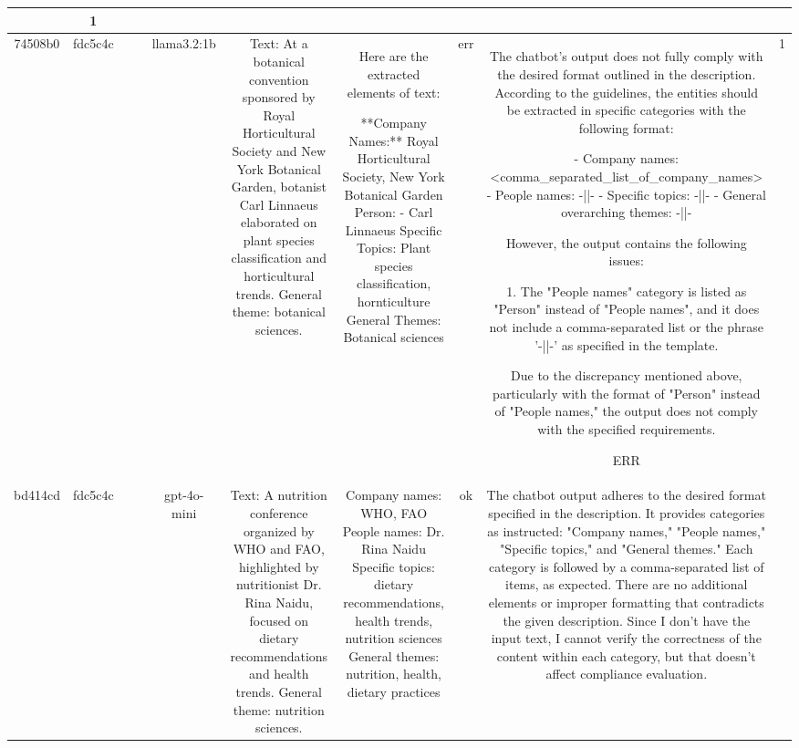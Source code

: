 \begin{table}[h!]
\begin{tabular}{|c|c|c|c|c|c|c|c|c|c|}
{ERR & 1\\
\hline
74508b0 & fdc5c4c &  &  & llama3.2:1b & Text: At a botanical convention sponsored by Royal Horticultural Society and New York Botanical Garden, botanist Carl Linnaeus elaborated on plant species classification and horticultural trends. General theme: botanical sciences. & Here are the extracted elements of text:

**Company Names:** Royal Horticultural Society, New York Botanical Garden
Person:
  - Carl Linnaeus
Specific Topics: Plant species classification, hornticulture
General Themes: Botanical sciences & err & The chatbot's output does not fully comply with the desired format outlined in the description. According to the guidelines, the entities should be extracted in specific categories with the following format: 

- Company names: <comma_separated_list_of_company_names>
- People names: -||-
- Specific topics: -||-
- General overarching themes: -||-

However, the output contains the following issues:

1. The "People names" category is listed as "Person" instead of "People names", and it does not include a comma-separated list or the phrase '-||-' as specified in the template.

Due to the discrepancy mentioned above, particularly with the format of "Person" instead of "People names," the output does not comply with the specified requirements. 

ERR & 1\\
\hline
bd414cd & fdc5c4c &  &  & gpt-4o-mini & Text: A nutrition conference organized by WHO and FAO, highlighted by nutritionist Dr. Rina Naidu, focused on dietary recommendations and health trends. General theme: nutrition sciences. & Company names: WHO, FAO  
People names: Dr. Rina Naidu  
Specific topics: dietary recommendations, health trends, nutrition sciences  
General themes: nutrition, health, dietary practices   & ok & The chatbot output adheres to the desired format specified in the description. It provides categories as instructed: "Company names," "People names," "Specific topics," and "General themes." Each category is followed by a comma-separated list of items, as expected. There are no additional elements or improper formatting that contradicts the given description. Since I don't have the input text, I cannot verify the correctness of the content within each category, but that doesn't affect compliance evaluation.

}
\end{tabular}
\end{table}
